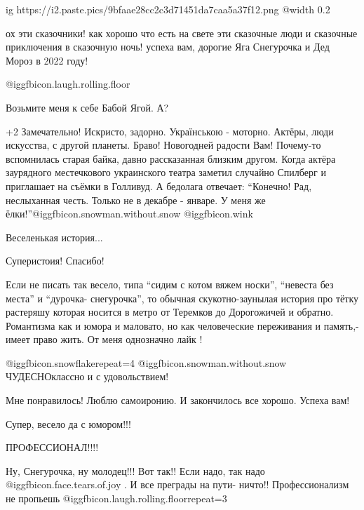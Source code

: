 \begin{itemize}
\ifcmt
  ig https://i2.paste.pics/9bfaae28cc2c3d71451da7caa5a37f12.png
  @width 0.2
\fi


ох эти сказочники! как хорошо что есть на свете эти сказочные люди и сказочные
приключения в сказочную ночь! успеха вам, дорогие Яга Снегурочка и Дед Мороз в
2022 году!


 @igg{fbicon.laugh.rolling.floor} 

Возьмите меня к себе Бабой Ягой. А?


+2
Замечательно! Искристо, задорно. Українською - моторно. Актёры, люди искусства,
с другой планеты. Браво! Новогодней радости Вам! Почему-то вспомнилась старая
байка, давно рассказанная близким другом. Когда актёра заурядного местечкового
украинского театра заметил случайно Спилберг и приглашает на съёмки в Голливуд.
А бедолага отвечает: \enquote{Конечно! Рад, неслыханная честь. Только не в декабре -
январе. У меня же ёлки!}@igg{fbicon.snowman.without.snow} @igg{fbicon.wink} 


Веселенькая история...

Суперистоия! Спасибо!


Если не писать так весело, типа \enquote{сидим с котом вяжем носки}, \enquote{невеста без
места} и \enquote{дурочка- снегурочка}, то обычная скукотно-заунылая история про тётку
растеряшу которая носится в метро от Теремков до Дорогожичей и обратно.
Романтизма как и юмора и маловато, но как человеческие переживания и память,-
имеет право жить. От меня однозначно лайк !


@igg{fbicon.snowflake}{repeat=4}  @igg{fbicon.snowman.without.snow} ЧУДЕСНОклассно и с удовольствием!

Мне понравилось! Люблю самоиронию. И закончилось все хорошо.
Успеха вам!

Супер, весело да с юмором!!!

ПРОФЕССИОНАЛ!!!!


Ну, Снегурочка, ну молодец!!! Вот так!! Если надо, так надо @igg{fbicon.face.tears.of.joy} . И все преграды
на пути- ничто!! Профессионализм не пропьешь  @igg{fbicon.laugh.rolling.floor}{repeat=3} 


\end{itemize}
